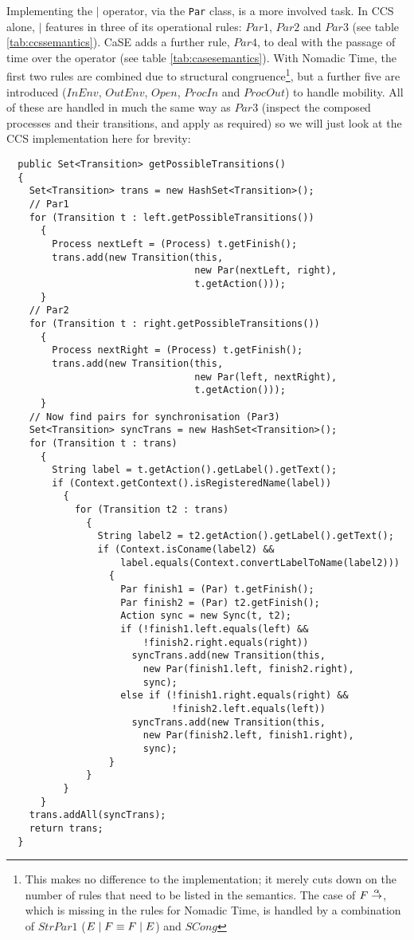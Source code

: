 Implementing the $\mid$ operator, via the \texttt{Par} class, is a
more involved task.  In CCS alone, $\mid$ features in three of its
operational rules: $Par1$, $Par2$ and $Par3$ (see table
\ref{tab:ccssemantics}).  CaSE adds a further rule, $Par4$, to deal
with the passage of time over the operator (see table
\ref{tab:casesemantics}).  With Nomadic Time, the first two rules are
combined due to structural congruence\footnote{This makes no
  difference to the implementation; it merely cuts down on the number
  of rules that need to be listed in the semantics.  The case of $F
  \stackrel{\alpha}{\rightarrow}$, which is missing in the rules for Nomadic Time,
  is handled by a combination of $StrPar1$ ($E \;|\; F \equiv F \;|\; E$)
  and $SCong$}, but a further five are introduced ($InEnv$, $OutEnv$,
$Open$, $ProcIn$ and $ProcOut$) to handle mobility.  All of these are
handled in much the same way as $Par3$ (inspect the composed processes
and their transitions, and apply as required) so we will just look at
the CCS implementation here for brevity:

\begin{verbatim}
  public Set<Transition> getPossibleTransitions()
  {
    Set<Transition> trans = new HashSet<Transition>();
    // Par1
    for (Transition t : left.getPossibleTransitions())
      {
        Process nextLeft = (Process) t.getFinish();
        trans.add(new Transition(this,
                                 new Par(nextLeft, right),
                                 t.getAction()));
      }
    // Par2
    for (Transition t : right.getPossibleTransitions())
      {
        Process nextRight = (Process) t.getFinish();
        trans.add(new Transition(this,
                                 new Par(left, nextRight),
                                 t.getAction()));
      }
    // Now find pairs for synchronisation (Par3)
    Set<Transition> syncTrans = new HashSet<Transition>();
    for (Transition t : trans)
      {
        String label = t.getAction().getLabel().getText();
        if (Context.getContext().isRegisteredName(label))
          {
            for (Transition t2 : trans)
              {
                String label2 = t2.getAction().getLabel().getText();
                if (Context.isConame(label2) &&
                    label.equals(Context.convertLabelToName(label2)))
                  {
                    Par finish1 = (Par) t.getFinish();
                    Par finish2 = (Par) t2.getFinish();
                    Action sync = new Sync(t, t2);
                    if (!finish1.left.equals(left) &&
                        !finish2.right.equals(right))
                      syncTrans.add(new Transition(this,
                        new Par(finish1.left, finish2.right),
                        sync);
                    else if (!finish1.right.equals(right) &&
                             !finish2.left.equals(left))
                      syncTrans.add(new Transition(this,
                        new Par(finish2.left, finish1.right),
                        sync);
                  }
              }
          }
      }
    trans.addAll(syncTrans);
    return trans;
  }
\end{verbatim}

